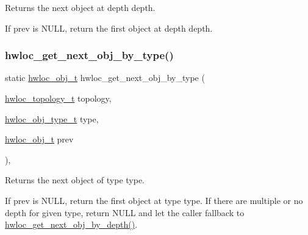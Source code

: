 Returns the next object at depth {\ttfamily depth}. 

If {\ttfamily prev} is {\ttfamily N\+U\+LL}, return the first object at depth {\ttfamily depth}. \mbox{\label{a00187_ga759e88eaf5a230ad283e9d4c42486735}} 
\subsubsection{\texorpdfstring{hwloc\+\_\+get\+\_\+next\+\_\+obj\+\_\+by\+\_\+type()}{hwloc\_get\_next\_obj\_by\_type()}}
{\footnotesize\ttfamily static \hyperlink{a00185_ga79b8ab56877ef99ac59b833203391c7d}{hwloc\+\_\+obj\+\_\+t} hwloc\+\_\+get\+\_\+next\+\_\+obj\+\_\+by\+\_\+type (\begin{DoxyParamCaption}\item[{\hyperlink{a00186_ga9d1e76ee15a7dee158b786c30b6a6e38}{hwloc\+\_\+topology\+\_\+t}}]{topology,  }\item[{\hyperlink{a00184_gacd37bb612667dc437d66bfb175a8dc55}{hwloc\+\_\+obj\+\_\+type\+\_\+t}}]{type,  }\item[{\hyperlink{a00185_ga79b8ab56877ef99ac59b833203391c7d}{hwloc\+\_\+obj\+\_\+t}}]{prev }\end{DoxyParamCaption})\hspace{0.3cm}{\ttfamily [inline]}, {\ttfamily [static]}}



Returns the next object of type {\ttfamily type}. 

If {\ttfamily prev} is {\ttfamily N\+U\+LL}, return the first object at type {\ttfamily type}. If there are multiple or no depth for given type, return {\ttfamily N\+U\+LL} and let the caller fallback to \hyperlink{a00187_gac140a9b939d9fa0b30c4a910efcb0656}{hwloc\+\_\+get\+\_\+next\+\_\+obj\+\_\+by\+\_\+depth()}. \mbox{\label{a00187_ga391f6b2613f0065673eaa4069b93d4e0}} 

